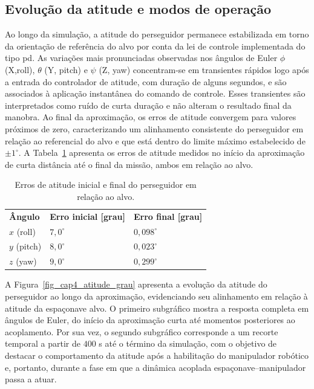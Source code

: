 \subsection{Evolução da atitude e modos de operação}
\label{sec_cap4_app_final_atitude}

Ao longo da simulação, a atitude do perseguidor permanece estabilizada em torno da orientação de referência do alvo por conta da lei de controle implementada do tipo \gls{pd}.
As variações mais pronunciadas observadas nos ângulos de Euler $\phi$ (X,roll), $\theta$ (Y, pitch) e $\psi$ (Z, yaw) concentram-se em transientes rápidos logo após a entrada do controlador de atitude, com duração de alguns segundos, e são associados à aplicação instantânea do comando de controle.
Esses transientes são interpretados como ruído de curta duração e não alteram o resultado final da manobra.
Ao final da aproximação, os erros de atitude convergem para valores próximos de zero, caracterizando um alinhamento consistente do perseguidor em relação ao referencial do alvo e que está dentro do limite máximo estabelecido de $\pm 1^{\circ}$.
A Tabela~\ref{tab_cap4_app_curta_erros_atitude} apresenta os erros de atitude medidos no início da aproximação de curta distância até o final da missão, ambos em relação ao alvo.

\begin{table}[H]
\centering
\caption{Erros de atitude inicial e final do perseguidor em relação ao alvo.}
\label{tab_cap4_app_curta_erros_atitude}
\begin{tabularx}{\linewidth}{|
  >{\centering\arraybackslash}X|
  >{\centering\arraybackslash}X|
  >{\centering\arraybackslash}X|}
\hline
\textbf{Ângulo} &
\textbf{Erro inicial [grau]} &
\textbf{Erro final [grau]} \\
\hhline{|=|=|=|}
$x$ (roll)   & $7{,}0^\circ$  & $0{,}098^\circ$ \\
$y$ (pitch)& $8{,}0^\circ$  & $0{,}023^\circ$ \\
$z$ (yaw)    & $9{,}0^\circ$  & $0{,}299^\circ$ \\
\hline
\end{tabularx}
\end{table}

A Figura~\ref{fig_cap4_atitude_grau} apresenta a evolução da atitude do perseguidor ao longo da aproximação, evidenciando seu alinhamento em relação à atitude da espaçonave alvo.
O primeiro subgráfico mostra a resposta completa em ângulos de Euler, do início da aproximação curta até momentos posteriores ao acoplamento.
Por sua vez, o segundo subgráfico corresponde a um recorte temporal a partir de $400$ s até o término da simulação, com o objetivo de destacar o comportamento da atitude após a habilitação do manipulador robótico e, portanto, durante a fase em que a dinâmica acoplada espaçonave--manipulador passa a atuar.

